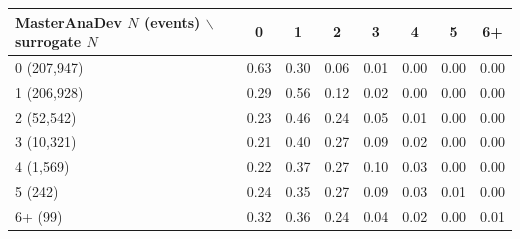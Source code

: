 \begin{tabular}{lccccccc}
\toprule
MasterAnaDev $N$ (events) $\backslash$ surrogate $N$ & 0 & 1 & 2 & 3 & 4 & 5 & 6+ \\
\midrule
0 (207,947) & 0.63 & 0.30 & 0.06 & 0.01 & 0.00 & 0.00 & 0.00 \\
1 (206,928) & 0.29 & 0.56 & 0.12 & 0.02 & 0.00 & 0.00 & 0.00 \\
2 (52,542) & 0.23 & 0.46 & 0.24 & 0.05 & 0.01 & 0.00 & 0.00 \\
3 (10,321) & 0.21 & 0.40 & 0.27 & 0.09 & 0.02 & 0.00 & 0.00 \\
4 (1,569) & 0.22 & 0.37 & 0.27 & 0.10 & 0.03 & 0.00 & 0.00 \\
5 (242) & 0.24 & 0.35 & 0.27 & 0.09 & 0.03 & 0.01 & 0.00 \\
6+ (99) & 0.32 & 0.36 & 0.24 & 0.04 & 0.02 & 0.00 & 0.01 \\
\bottomrule
\end{tabular}
